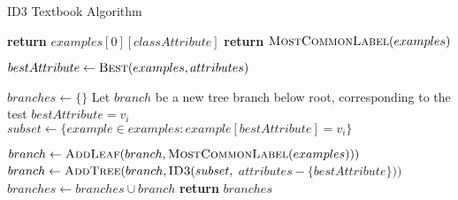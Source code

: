 \begin{algorithm}[H]
\caption{ID3 Textbook Algorithm}\label{a:id3-simple}
\begin{algorithmic}[1]
        \State \textbf{return} $examples[0][classAttribute]$
        \State \textbf{return} $\textsc{MostCommonLabel}(examples)$
    \EndIf

    \State $bestAttribute \gets \textsc{Best}(examples, attributes)$

    \State $branches \gets \{\}$
        \State Let $branch$ be a new tree branch below root, corresponding to the test $bestAttribute = v_i$
        \State $subset \gets \{example \in examples : example[bestAttribute] = v_i\}$

            \State $branch \gets \textsc{AddLeaf}(branch, \textsc{MostCommonLabel}(examples)))$
        \Else
            \State $branch \gets \textsc{AddTree}(branch, \textsc{ID3}(subset,$ $attributes - \{bestAttribute\}))$
        \EndIf
        \State $branches \gets branches \cup branch$
    \EndFor
    \State \textbf{return} $branches$
\EndProcedure
\end{algorithmic}
\end{algorithm}


